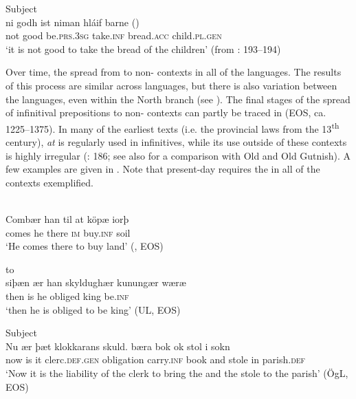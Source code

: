 \documentclass[output=paper]{langscibook}
\begin{document}
\ex Subject\\ \label{ex:kalm:3c}
\gll ni godh ist niman hláif barne ()\\
not good be.\textsc{prs.3sg} take.\textsc{inf} bread.\textsc{acc} child.\textsc{pl.gen}\\
\glt‘it is not good to take the bread of the children’ (from \citealt{Wright1954}: 193–194)
\z
\z

Over time, the  spread from  to non- contexts in all of the  languages. The results of this process are similar across  languages, but there is also variation between the languages, even within the North  branch (see \citealt{Haspelmath1989,Los2005,Kalm2016Prepositioner, Kalm2016Satsekvivalenta,Kalm2019}). The final stages of the spread of infinitival prepositions to non- contexts can partly be traced in  (EOS, ca. 1225–1375). In many of the earliest  texts (i.e. the provincial laws from the 13\textsuperscript{th} century), \textit{at} is regularly used in  infinitives, while its use outside of these contexts is highly irregular (\citealt{Kalm2016Satsekvivalenta}: 186; see also \citealt{Kalm2019} for a comparison with Old  and Old Gutnish). A few examples are given in . Note that present-day  requires the  in all of the contexts exemplified.\pagebreak


\ea
\label{ex:kalm:4}
\ea {}\\\label{ex:kalm:4a}
\gll Combær han til at köpæ iorþ\\ 
comes he there \textsc{im} buy.\textsc{inf} soil\\
\glt‘He comes there to buy land’ (, EOS) 

\ex {} to \\\label{ex:kalm:4b}
\gll siþæn ær han skyldughær kunungær wæræ\\
 then is he obliged king be.\textsc{inf}\\
\glt ‘then he is obliged to be king’ (UL, EOS)
 
\ex Subject\\\label{ex:kalm:4c}
\gll Nu ær þæt klokkarans skuld. bæra bok ok stol i sokn\\
now is it clerc.\textsc{def.gen} obligation carry.\textsc{inf} book and stole in parish.\textsc{def}\\
\glt ‘Now it is the liability of the clerk to bring the  and the stole to the parish’ (ÖgL, EOS)
\z 
\z 
\end{document}

